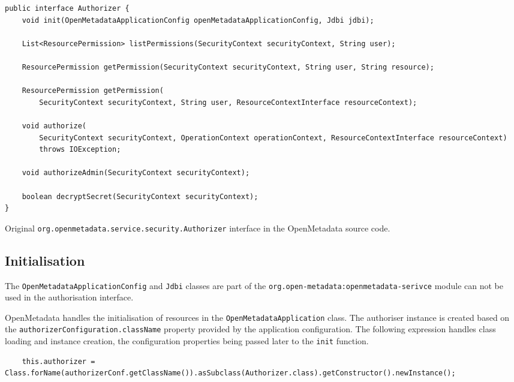 \begin{listing}

\begin{verbatim}
public interface Authorizer {
    void init(OpenMetadataApplicationConfig openMetadataApplicationConfig, Jdbi jdbi);

    List<ResourcePermission> listPermissions(SecurityContext securityContext, String user);

    ResourcePermission getPermission(SecurityContext securityContext, String user, String resource);

    ResourcePermission getPermission(
        SecurityContext securityContext, String user, ResourceContextInterface resourceContext);

    void authorize(
        SecurityContext securityContext, OperationContext operationContext, ResourceContextInterface resourceContext)
        throws IOException;

    void authorizeAdmin(SecurityContext securityContext);

    boolean decryptSecret(SecurityContext securityContext);
}
\end{verbatim}

\caption{Original \texttt{org.openmetadata.service.security.Authorizer} interface in the OpenMetadata source code.}
\label{listing:original_authorizer}

\end{listing}

\subsection{Initialisation}

The \texttt{OpenMetadataApplicationConfig} and \texttt{Jdbi} classes are part of the \texttt{org.open-metadata:openmetadata-serivce} module can not be used in the authorisation interface.

OpenMetadata handles the initialisation of resources in the \texttt{OpenMetadataApplication} class. The authoriser instance is created based on the \texttt{authorizerConfiguration.className} property provided by the application configuration. The following expression handles class loading and instance creation, the configuration properties being passed later to the \texttt{init} function.

\begin{verbatim}
    this.authorizer = Class.forName(authorizerConf.getClassName()).asSubclass(Authorizer.class).getConstructor().newInstance();
\end{verbatim}

